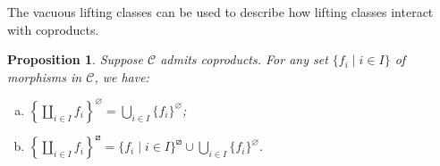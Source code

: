 \documentclass{amsart}
\renewcommand\emptyset\varnothing
\newcommand{\catC}{\mathcal{C}}
\newcommand{\rlp}[1]{{#1}^{\boxslash}}
\numberwithin{equation}{section}
\newtheorem{proposition}[equation]{Proposition}
\theoremstyle{definition}
\begin{document}
The vacuous lifting classes can be used to describe how lifting classes interact with coproducts.

\begin{proposition}
	\label{lifting class of coproduct}
	Suppose $\catC$ admits coproducts. For any set $\{f_i \mid i \in I\}$ of morphisms in $\catC$, we have:
	\begin{enumerate}[(a)]
		\item $\displaystyle \left\{\coprod_{i \in I} f_i\right\}^\emptyset = \bigcup_{i \in I} \{f_i\}^\emptyset$;
		\item $\displaystyle
			      \rlp{\left\{\coprod_{i \in I} f_i\right\}} = \rlp{\{f_i \mid i \in I\}} \cup \bigcup_{i \in I} \{f_i\}^\emptyset.
		      $
	\end{enumerate}
\end{proposition}
\end{document}
